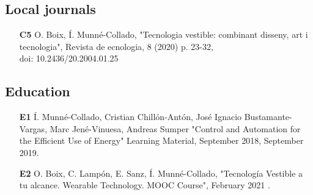 \subsection*{Local journals}
\begin{itemize}
	\item [\textbf{C5}] O. Boix, \'{I}. Munn\'{e}-Collado, "Tecnologia vestible: combinant disseny, art i tecnologia", Revista de ecnologia, 8 (2020) p. 23-32,  \\doi: 10.2436/20.2004.01.25
\end{itemize}

\subsection*{Education}

\begin{itemize}
	\item [\textbf{E1}] \'{I}. Munn\'{e}-Collado, Cristian Chill\'{o}n-Ant\'{o}n, Jos\'{e} Ignacio Bustamante-Vargas, Marc Jen\'{e}-Vinuesa, Andreas Sumper "Control and Automation for the Efficient Use of Energy" Learning Material, September 2018, September 2019.	
	\item [\textbf{E2}] O. Boix, C. Lamp\'{o}n, E. Sanz, \'{I}. Munn\'{e}-Collado, "Tecnolog\'{i}a Vestible a tu alcance. Wearable Technology. MOOC Course", February 2021	.
\end{itemize}


